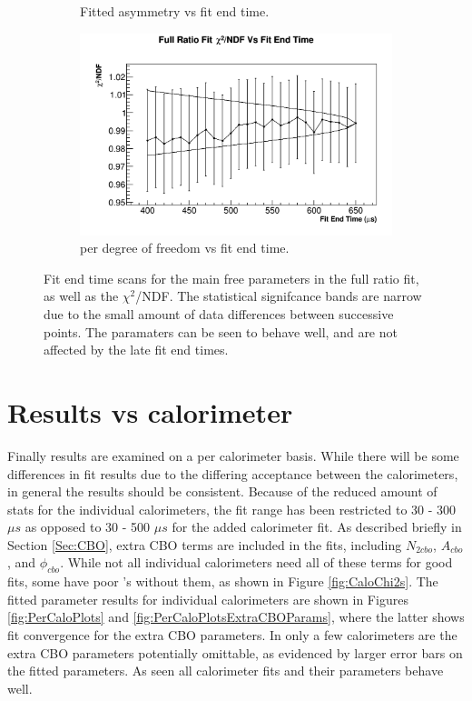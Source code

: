 \begin{figure}[]
\begin{subfigure}[t]{0.45\textwidth}
		    \caption{Fitted asymmetry vs fit end time.}
	    \end{subfigure}
	    \begin{subfigure}[t]{0.45\textwidth}
		    \centering
			\includegraphics[width=\textwidth]{RatioCBO_Chi2NDF_Vs_FE_canv}
		    \caption{\chisq per degree of freedom vs fit end time.}
	    \end{subfigure}%
	\caption[FitEndScans]{Fit end time scans for the main free parameters in the full ratio fit, as well as the $\chi^{2}$/NDF. The statistical signifcance bands are narrow due to the small amount of data differences between successive points. The paramaters can be seen to behave well, and are not affected by the late fit end times.}
	\label{fig:FitEndScans}
	\end{figure}


\clearpage

\section{Results vs calorimeter}

	Finally results are examined on a per calorimeter basis. While there will be some differences in fit results due to the differing acceptance between the calorimeters, in general the results should be consistent. Because of the reduced amount of stats for the individual calorimeters, the fit range has been restricted to 30 - 300 $\mu s$ as opposed to 30 - 500 $\mu s$ for the added calorimeter fit. As described briefly in Section \ref{Sec:CBO}, extra CBO terms are included in the fits, including $N_{2cbo}$, $A_{cbo}$, and $\phi_{cbo}$. While not all individual calorimeters need all of these terms for good fits, some have poor \chisq's without them, as shown in Figure \ref{fig:CaloChi2s}. The fitted parameter results for individual calorimeters are shown in Figures \ref{fig:PerCaloPlots} and \ref{fig:PerCaloPlotsExtraCBOParams}, where the latter shows fit convergence for the extra CBO parameters. In only a few calorimeters are the extra CBO parameters potentially omittable, as evidenced by larger error bars on the fitted parameters. As seen all calorimeter fits and their parameters behave well.

